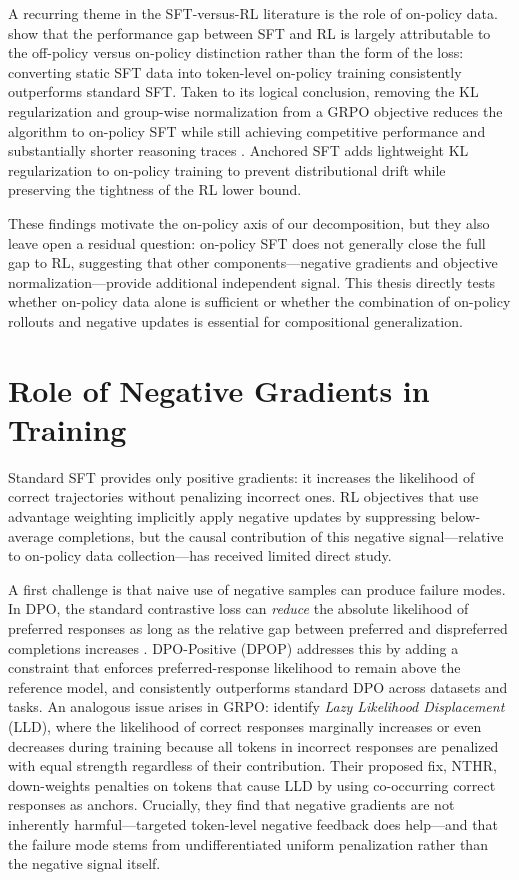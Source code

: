 \documentclass[12pt]{cmuthesis}
\begin{document}
A recurring theme in the SFT-versus-RL literature is the role of on-policy data.
\citet{mingOneTokenRolloutGuiding2026} show that the performance gap between SFT and RL is largely attributable to the off-policy versus on-policy distinction rather than the form of the loss: converting static SFT data into token-level on-policy training consistently outperforms standard SFT.
Taken to its logical conclusion, removing the KL regularization and group-wise normalization from a GRPO objective reduces the algorithm to on-policy SFT while still achieving competitive performance and substantially shorter reasoning traces \citep{zhaoOnPolicySupervisedFineTuning2026}.
Anchored SFT \citep{zhuAnchoredSupervisedFineTuning2026} adds lightweight KL regularization to on-policy training to prevent distributional drift while preserving the tightness of the RL lower bound.

These findings motivate the on-policy axis of our decomposition, but they also leave open a residual question: on-policy SFT does not generally close the full gap to RL, suggesting that other components---negative gradients and objective normalization---provide additional independent signal.
This thesis directly tests whether on-policy data alone is sufficient or whether the combination of on-policy rollouts and negative updates is essential for compositional generalization.

\section{Role of Negative Gradients in Training}

Standard SFT provides only positive gradients: it increases the likelihood of correct trajectories without penalizing incorrect ones.
RL objectives that use advantage weighting implicitly apply negative updates by suppressing below-average completions, but the causal contribution of this negative signal---relative to on-policy data collection---has received limited direct study.

A first challenge is that naive use of negative samples can produce failure modes.
In DPO, the standard contrastive loss can \emph{reduce} the absolute likelihood of preferred responses as long as the relative gap between preferred and dispreferred completions increases \citep{pal_smaug_2024}.
DPO-Positive (DPOP) addresses this by adding a constraint that enforces preferred-response likelihood to remain above the reference model, and consistently outperforms standard DPO across datasets and tasks.
An analogous issue arises in GRPO: \citet{deng_effect_2025} identify \emph{Lazy Likelihood Displacement} (LLD), where the likelihood of correct responses marginally increases or even decreases during training because all tokens in incorrect responses are penalized with equal strength regardless of their contribution.
Their proposed fix, NTHR, down-weights penalties on tokens that cause LLD by using co-occurring correct responses as anchors.
Crucially, they find that negative gradients are not inherently harmful---targeted token-level negative feedback does help---and that the failure mode stems from undifferentiated uniform penalization rather than the negative signal itself.
\end{document}
